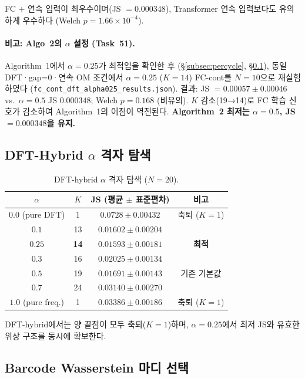 \documentclass[11pt,a4paper]{article}
\begin{document}
FC + 연속 입력이 최우수이며(JS $=0.000348$),
Transformer 연속 입력보다도 유의하게 우수하다
(Welch $p = 1.66 \times 10^{-4}$).

\paragraph{비고: Algo~2의 $\alpha$ 설정 (Task~51).}
Algorithm~1에서 $\alpha=0.25$가 최적임을 확인한 후
(\S\ref{subsec:percycle}, \S\ref{subsec:alpha}),
동일 DFT·gap=0·연속 OM 조건에서 $\alpha=0.25$ ($K=14$)
FC-cont를 $N=10$으로 재실험하였다
(\texttt{fc\_cont\_dft\_alpha025\_results.json}).
결과: JS $= 0.00057 \pm 0.00046$ vs.\ $\alpha=0.5$ JS $0.000348$;
Welch $p = 0.168$ (비유의).
$K$ 감소(19→14)로 FC 학습 신호가 감소하여 Algorithm~1의
이점이 역전된다.
\textbf{Algorithm~2 최저는 $\alpha=0.5$, JS $=0.000348$을 유지.}

\subsection{DFT-Hybrid $\alpha$ 격자 탐색}
\label{subsec:alpha}

\begin{table}[H]
\centering
\caption{DFT-hybrid $\alpha$ 격자 탐색 ($N=20$).}
\label{tab:alpha}
\begin{tabular}{cccc}
\toprule
$\alpha$ & $K$ & JS (평균 $\pm$ 표준편차) & 비고 \\
\midrule
$0.0$ (pure DFT) & 1 & $0.0728 \pm 0.00432$ & 축퇴 ($K=1$) \\
$0.1$ & 13 & $0.01602 \pm 0.00204$ &  \\
\textbf{$0.25$} & \textbf{14} & \textbf{$0.01593 \pm 0.00181$} & \textbf{최적} \\
$0.3$ & 16 & $0.02025 \pm 0.00134$ &  \\
$0.5$ & 19 & $0.01691 \pm 0.00143$ & 기존 기본값 \\
$0.7$ & 24 & $0.03140 \pm 0.00270$ &  \\
$1.0$ (pure freq.) & 1 & $0.03386 \pm 0.00186$ & 축퇴 ($K=1$) \\
\bottomrule
\end{tabular}
\end{table}

DFT-hybrid에서는 양 끝점이 모두 축퇴($K=1$)하며,
$\alpha=0.25$에서 최저 JS와 유효한 위상 구조를 동시에 확보한다.

\subsection{Barcode Wasserstein 마디 선택}
\end{document}
